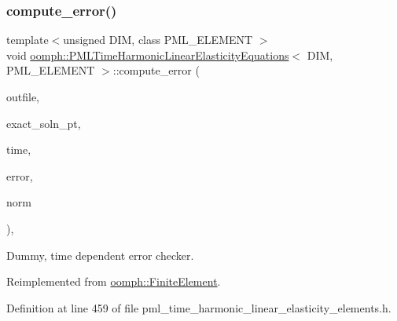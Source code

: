\subsubsection{\texorpdfstring{compute\+\_\+error()}{compute\_error()}\hspace{0.1cm}{\footnotesize\ttfamily [2/2]}}
{\footnotesize\ttfamily template$<$unsigned D\+IM, class P\+M\+L\+\_\+\+E\+L\+E\+M\+E\+NT $>$ \\
void \hyperlink{classoomph_1_1PMLTimeHarmonicLinearElasticityEquations}{oomph\+::\+P\+M\+L\+Time\+Harmonic\+Linear\+Elasticity\+Equations}$<$ D\+IM, P\+M\+L\+\_\+\+E\+L\+E\+M\+E\+NT $>$\+::compute\+\_\+error (\begin{DoxyParamCaption}\item[{std\+::ostream \&}]{outfile,  }\item[{\hyperlink{classoomph_1_1FiniteElement_ad4ecf2b61b158a4b4d351a60d23c633e}{Finite\+Element\+::\+Unsteady\+Exact\+Solution\+Fct\+Pt}}]{exact\+\_\+soln\+\_\+pt,  }\item[{const double \&}]{time,  }\item[{double \&}]{error,  }\item[{double \&}]{norm }\end{DoxyParamCaption})\hspace{0.3cm}{\ttfamily [inline]}, {\ttfamily [virtual]}}



Dummy, time dependent error checker. 



Reimplemented from \hyperlink{classoomph_1_1FiniteElement_a7f67853506dc73fa6b7505108de22d1f}{oomph\+::\+Finite\+Element}.



Definition at line 459 of file pml\+\_\+time\+\_\+harmonic\+\_\+linear\+\_\+elasticity\+\_\+elements.\+h.

\mbox{\label{classoomph_1_1PMLTimeHarmonicLinearElasticityEquations_af71b0560271b3e27c74b39f6b247fc81}} 
